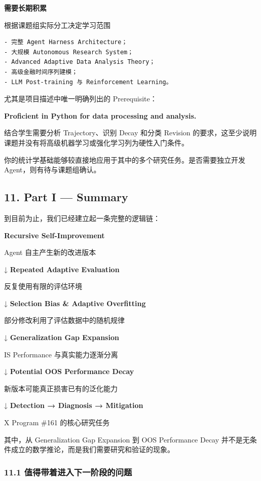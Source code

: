 \textbf{需要长期积累}

根据课题组实际分工决定学习范围

\begin{verbatim}
- 完整 Agent Harness Architecture；
- 大规模 Autonomous Research System；
- Advanced Adaptive Data Analysis Theory；
- 高级金融时间序列建模；
- LLM Post-training 与 Reinforcement Learning。
\end{verbatim}

尤其是项目描述中唯一明确列出的 Prerequisite：

\textbf{Proficient in Python for data processing and analysis.}

结合学生需要分析 Trajectory、识别 Decay 和分类 Revision 的要求，这至少说明课题并没有将高级机器学习或强化学习列为硬性入门条件。

你的统计学基础能够较直接地应用于其中的多个研究任务。是否需要独立开发 Agent，则有待与课题组确认。

\hypertarget{part-1-07-0001-part-i-summary}{%
\subsection{11. Part I --- Summary}\label{part-1-07-0001-part-i-summary}}

到目前为止，我们已经建立起一条完整的逻辑链：

\textbf{Recursive Self-Improvement}

Agent 自主产生新的改进版本

↓ \textbf{Repeated Adaptive Evaluation}

反复使用有限的评估环境

↓ \textbf{Selection Bias \& Adaptive Overfitting}

部分修改利用了评估数据中的随机规律

↓ \textbf{Generalization Gap Expansion}

IS Performance 与真实能力逐渐分离

↓ \textbf{Potential OOS Performance Decay}

新版本可能真正损害已有的泛化能力

↓ \textbf{Detection → Diagnosis → Mitigation}

X Program \#161 的核心研究任务

其中，从 Generalization Gap Expansion 到 OOS Performance Decay 并不是无条件成立的数学推论，而是我们需要研究和验证的现象。

\hypertarget{part-1-07-0001-ux503cux5f97ux5e26ux7740ux8fdbux5165ux4e0bux4e00ux9636ux6bb5ux7684ux95eeux9898}{%
\subsubsection{11.1 值得带着进入下一阶段的问题}\label{part-1-07-0001-ux503cux5f97ux5e26ux7740ux8fdbux5165ux4e0bux4e00ux9636ux6bb5ux7684ux95eeux9898}}

